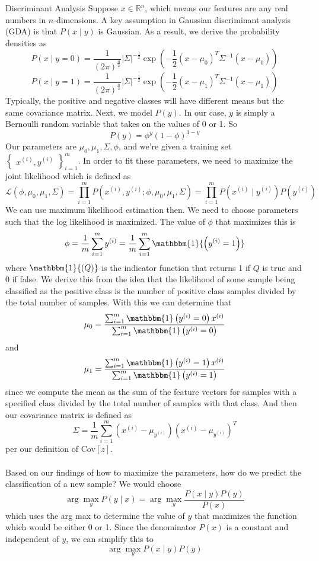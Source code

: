 \documentclass[11pt]{article}
\begin{document}
\begin{section}{Discriminant Analysis}
Suppose $x \in \mathbb{R}^n$, which means our features are any real numbers in $n$-dimensions. A key assumption in Gaussian discriminant analysis (GDA) is that $P(x \mid y)$ is Gaussian. As a result, we derive the probability densities as
$$P(x\mid y=0)=\frac{1}{(2\pi)^{\frac{n}{2}}}\left|\Sigma\right|^{-\frac{1}{2}}\exp{\left(-\frac{1}{2}(x-\mu_0)^T \Sigma^{-1}(x-\mu_0)\right)}$$
$$P(x\mid y=1)=\frac{1}{(2\pi)^{\frac{n}{2}}}\left|\Sigma\right|^{-\frac{1}{2}}\exp{\left(-\frac{1}{2}(x-\mu_1)^T \Sigma^{-1}(x-\mu_1)\right)}$$
Typically, the positive and negative classes will have different means but the same covariance matrix. Next, we model $P(y)$. In our case, $y$ is simply a Bernoulli random variable that takes on the values of 0 or 1. So
$$P(y) = \phi^y(1-\phi)^{1-y}$$
Our parameters are $\mu_0, \mu_1, \Sigma, \phi$, and we're given a training set $\begin{Bmatrix}x^{(i)},y^{(i)}\end{Bmatrix}_{i=1}^{m}$. In order to fit these parameters, we need to maximize the joint likelihood which is defined as
$$\mathcal{L}(\phi,\mu_0,\mu_1,\Sigma) = \prod_{i=1}^{m} P\left(x^{(i)},y^{(i)};\phi,\mu_0,\mu_1,\Sigma\right) = \prod_{i=1}^{m} P\left(x^{(i)}\mid y^{(i)}\right)P\left(y^{(i)}\right)$$
We can use maximum likelihood estimation then. We need to choose parameters such that the log likelihood is maximized. The value of $\phi$ that maximizes this is
$$\phi = \frac{1}{m}\sum_{i=1}^{m} y^{(i)} = \frac{1}{m}\sum_{i=1}^{m} \mathbbm{1}{\left(y^{(i)}=1\right)}$$
where $\mathbbm{1}{(Q)}$ is the indicator function that returns 1 if $Q$ is true and 0 if false. We derive this from the idea that the likelihood of some sample being classified as the positive class is the number of positive class samples divided by the total number of samples. With this we can determine that
$$\mu_0 = \frac{\sum_{i=1}^{m}\mathbbm{1}\left(y^{(i)}=0\right)x^{(i)}}{\sum_{i=1}^{m}\mathbbm{1}\left(y^{(i)}=0\right)}$$
and
$$\mu_1 = \frac{\sum_{i=1}^{m}\mathbbm{1}\left(y^{(i)}=1\right)x^{(i)}}{\sum_{i=1}^{m}\mathbbm{1}\left(y^{(i)}=1\right)}$$
since we compute the mean as the sum of the feature vectors for samples with a specified class divided by the total number of samples with that class. And then our covariance matrix is defined as
$$\Sigma = \frac{1}{m}\sum_{i=1}^{m}\left(x^{(i)}-\mu_{y^{(i)}}\right)\left(x^{(i)}-\mu_{y^{(i)}}\right)^T$$
per our definition of $\text{Cov}[z]$.\\
\vspace{0em}\\
Based on our findings of how to maximize the parameters, how do we predict the classification of a new sample? We would choose
$$\arg{\max_{y} P(y \mid x)} = \arg{\max_{y} \frac{P(x \mid y)P(y)}{P(x)}}$$
which uses the arg max to determine the value of $y$ that maximizes the function which would be either 0 or 1. Since the denominator $P(x)$ is a constant and independent of $y$, we can simplify this to
$$\arg{\max_{y}P(x \mid y)P(y)}$$
\end{section}
\end{document}
